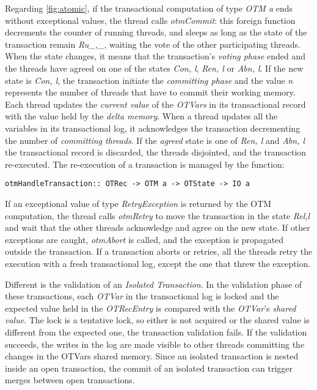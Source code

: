 Regarding \cref{fig:atomic}, if the transactional computation of type \emph{OTM a} ends without exceptional values, the thread calls \emph{otmCommit}: this foreign function decrements the counter of running threads, and sleeps as long as the state of the transaction remain \emph{Ru\textlangle \_,\_\textrangle}, waiting the vote of the other participating threads.
When the state changes, it means that the transaction's \emph{voting phase} ended and the threads have agreed on one of the states \emph{Co\textlangle n, l\textrangle}, \emph{Re\textlangle n, l\textrangle} or \emph{Ab\textlangle n, l\textrangle}.
If the new state is \emph{Co\textlangle n, l\textrangle}, the transaction initiate the \emph{committing phase} and the value \emph{n} represents the number of threads that have to commit their working memory.
Each thread updates the \emph{current value} of the \emph{OTVars} in its transactional record with the value held by the \emph{delta memory}. When a thread updates all the variables in its transactional log, it acknowledges the transaction decrementing the number of \emph{committing threads}.
If the \emph{agreed} state is one of \emph{Re\textlangle n, l\textrangle} and \emph{Ab\textlangle n, l\textrangle} the transactional record is discarded, the threads disjointed, and the transaction re-executed. The re-execution of a transaction is managed by the function:
\begin{lstlisting}
otmHandleTransaction:: OTRec -> OTM a -> OTState -> IO a
\end{lstlisting}

If an exceptional value of type \emph{RetryException} is returned by the OTM computation, the thread calls \emph{otmRetry} to move the transaction in the state \emph{Re\textlangle l,l\textrangle} and wait that the other threads acknowledge and agree on the new state. If other exceptions are caught, \emph{otmAbort} is called, and the exception is propagated outside the transaction. If a transaction aborts or retries, all the threads retry the execution with a fresh transactional log, except the one that threw the exception.


Different is the validation of an \emph{Isolated Transaction}.
In the validation phase of these transactions, each \emph{OTVar} in the transactional log is locked and the expected value held in the \emph{OTRecEntry} is compared with the \emph{OTVar}'s \emph{shared value}.
The lock is a tentative lock, so either is not acquired or the shared value is different from the expected one, the transaction validation fails.
If the validation succeeds, the writes in the log are made visible to other threads committing the changes in the OTVars shared memory. Since an isolated transaction is nested inside an open transaction, the commit of an isolated transaction can trigger merges between open transactions.

